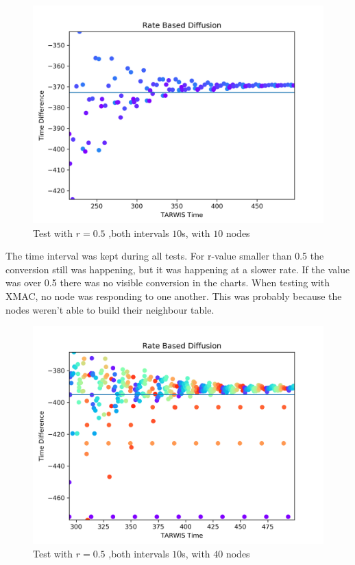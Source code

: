 \documentclass{llncs}
\begin{document}
\begin{figure}[H]
  \centering
  \includegraphics[width=\linewidth]{05_10.png}
  \caption{Test with $r=0.5$ ,both intervals $10$s, with $10$ nodes}
  \label{fig:Test with 10 Nodes}
\end{figure}

The time interval was kept during all tests. 
For r-value smaller than 0.5 the conversion still was happening, but it was happening at a slower rate. 
If the value was over 0.5 there was no visible conversion in the charts.
When testing with XMAC, no node was responding to one another. This was probably because the nodes weren't able to build their neighbour table.

\begin{figure}[H]
  \centering
  \includegraphics[width=\linewidth]{05_10_40.png}
  \caption{Test with $r=0.5$ ,both intervals $10$s, with $40$ nodes}
  \label{fig:Test with 40 Nodes}
\end{figure}
\end{document}
